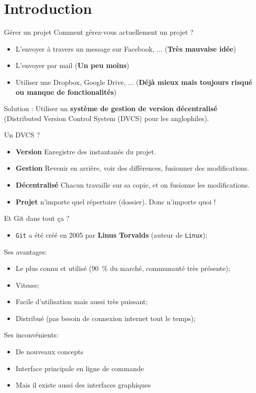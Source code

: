 \documentclass{beamer}
\begin{document}
\section{Introduction}

\begin{frame}{Gérer un projet}
Comment gérez-vous actuellement un projet ?

\begin{itemize}
    \item L'envoyer à travers un message sur Facebook, ... (\textbf{Très mauvaise idée})
    \item L'envoyer par mail (\textbf{Un peu moins})
    \item Utiliser une Dropbox, Google Drive, ... (\textbf{Déjà mieux mais toujours risqué ou manque de fonctionalités})
\end{itemize}

Solution : Utiliser un \textbf{système de gestion de version décentralisé}
(Distributed Version Control System (DVCS) pour les anglophiles).
\end{frame}

\begin{frame}{Un DVCS ?}
    \begin{itemize}
        \item \textbf{Version} Enregistre des \og{}instantanés\fg{} du projet.
        \item \textbf{Gestion} Revenir en arrière, voir des différences,
            fusionner des modifications.
        \item \textbf{Décentralisé} Chacun travaille sur sa copie, et on fusionne les modifications.
        \item \textbf{Projet} n'importe quel répertoire (\og dossier\fg). Donc n'importe quoi !
    \end{itemize}
\end{frame}

\begin{frame}{Et Git dans tout ça ?}
\begin{itemize}
    \item \texttt{Git} a été créé en 2005 par \textbf{Linus Torvalds} (auteur de \texttt{Linux});
\end{itemize}
Ses avantages:
\begin{itemize}
    \item Le plus connu et utilisé (90~\% du marché, communauté très présente);
    \item Vitesse;
    \item Facile d'utilisation mais aussi très puissant;
    \item Distribué (pas besoin de connexion internet tout le temps);
\end{itemize}

Ses inconvénients:
\begin{itemize}
    \item De nouveaux concepts
    \item Interface principale en ligne de commande
    \item Mais il existe aussi des interfaces graphiques
\end{itemize}
\end{frame}
\end{document}
